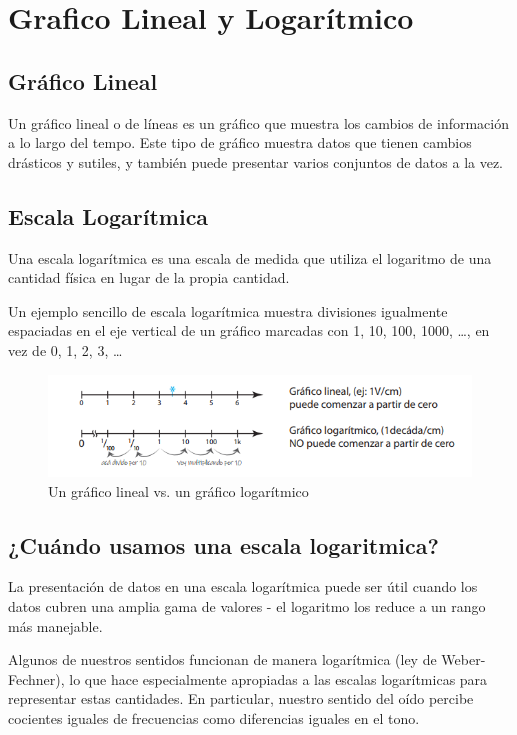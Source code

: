\documentclass[../main.tex]{subfiles}
\begin{document}
\renewcommand{\subsectionbreak}{}
\graphicspath{{../imagenes/grafico-lin-log}}
\section{Grafico Lineal y Logarítmico}
	\subsection{Gráfico Lineal}
	Un gráfico lineal o de líneas es un gráfico que muestra los cambios de información a lo
	largo del tempo. Este tipo de gráfico muestra datos que tienen cambios drásticos y
	sutiles, y también puede presentar varios conjuntos de datos a la vez.


	\subsection{Escala Logarítmica}
	Una escala logarítmica es una escala de medida que utiliza el logaritmo de una cantidad
	física en lugar de la propia cantidad.

	Un ejemplo sencillo de escala logarítmica muestra divisiones igualmente 
	espaciadas en el eje vertical de un gráfico marcadas con 1, 10, 100, 1000,
	\ldots{}, en vez de 0, 1, 2, 3, \ldots{} 
	\begin{figure}[H]
		\includegraphics[width=\textwidth]{imagen1}
		\caption{Un gráfico lineal vs. un gráfico logarítmico}
		\centering
	\end{figure}


	\subsection{¿Cuándo usamos una escala logaritmica?}
	La presentación de datos en una escala logarítmica puede ser útil cuando los datos
	cubren una amplia gama de valores - el logaritmo los reduce a un rango más manejable.

	Algunos de nuestros sentidos funcionan de manera logarítmica (ley de Weber-Fechner),
	lo que hace especialmente apropiadas a las escalas logarítmicas para representar 
	estas cantidades. En particular, nuestro sentido del oído percibe cocientes iguales
	de frecuencias como diferencias iguales en el tono.
\end{document}
